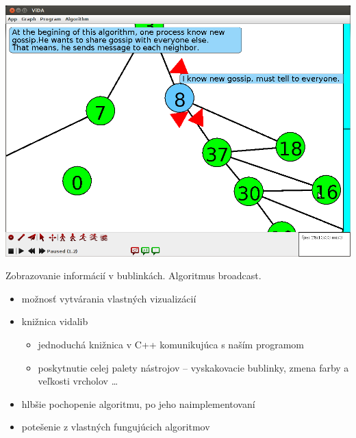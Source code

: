 
\includegraphics[width=\columnwidth]{bfs}
\caption{Zobrazovanie informácií v bublinkách. Algoritmus broadcast.}


\begin{itemize}

    \item možnosť vytvárania vlastných vizualizácií
    \item knižnica vidalib
        \begin{itemize}
            \item jednoduchá knižnica v C++ komunikujúca s naším programom
            \item poskytnutie celej palety nástrojov -- vyskakovacie bublinky, zmena farby a
            veľkosti vrcholov \dots
        \end{itemize}
    \item hlbšie pochopenie algoritmu, po jeho naimplementovaní
    \item potešenie z vlastných fungujúcich algoritmov

\end{itemize}




